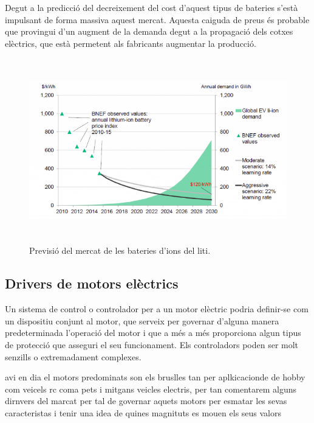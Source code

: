 Degut a la predicció del decreixement del cost d'aquest tipus de bateries s'està impulsant de forma massiva aquest mercat. Aquesta caiguda de preus és probable que provingui d'un augment de la demanda degut a la propagació dels cotxes elèctrics, que està permetent als fabricants augmentar la producció. 
\begin{figure}[H]
		\centering
    	\includegraphics[width=13cm, height=8cm]{Marcteoric/mercatbaterialitioion.png}
     	\caption{Previsió del mercat de les bateries d'ions del liti.} 
\end{figure}

\subsection{Drivers de motors elèctrics}

Un sistema de control o controlador per a un motor elèctric podria definir-se com un dispositiu conjunt al motor, que serveix per governar d'alguna manera predeterminada l'operació del motor i que a més a més proporciona algun tipus de protecció que asseguri el seu funcionament. Els controladors poden ser molt senzills o extremadament complexes.\bigskip

avi en dia el motors predominats son els bruslles tan per aplkicacionde de hobby com veicels rc coma pets i mitgans veicles electris, per tan comentarem alguns dirnvers del marcat per tal de governar aquets motors per esmatar les sevas caracteristas i tenir una idea de quines magnituts es mouen els seus valors 

